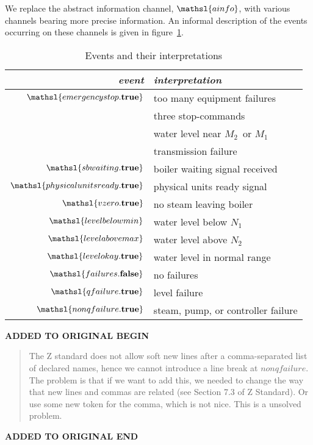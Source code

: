 \documentclass{report}
\newcommand{\true}{\ensuremath{\mathbf{true}}}
\newcommand{\false}{\ensuremath{\mathbf{false}}}
\newcommand{\event}[1]{\mathsl{#1}}
\newenvironment{addedstuff}{\begin{flushleft}\textbf{ADDED TO ORIGINAL BEGIN}\begin{quote}\begin{minipage}{.8\textwidth}}{\end{minipage}\end{quote}\textbf{ADDED TO ORIGINAL END}\end{flushleft}}
\begin{document}
We replace the abstract information channel, \( \mathsl{ainfo} \),
with various channels bearing more precise information.  An informal
description of the events occurring on these channels is given in
figure~\ref{figure:events}.
\begin{table}[htbp]
  \bigskip %
  \begin{center}
    \begin{tabular}{r|l}
      \textbf{\slshape event} & \textbf{\slshape interpretation}
      \\ %
      \hline %
      \( \event{emergencystop.\true} \) & too many equipment failures
      \\ %
      & three stop-commands
      \\ %
      & water level near \( M_2 \, \)\/ or \( M_1 \)
      \\ %
      & transmission failure
      \\ %
      \( \event{sbwaiting.\true} \) & boiler waiting signal received
      \\ %
      \( \event{physicalunitsready.\true} \) & physical units ready signal
      \\ %
      \( \event{vzero.\true} \) & no steam leaving boiler
      \\ %
      \( \event{levelbelowmin} \) & water level below \( N_1 \)
      \\ %
      \( \event{levelabovemax} \) & water level above \( N_2 \)
      \\ %
      \( \event{levelokay.\true} \) & water level in normal range
      \\ %
      \( \event{failures.\false} \) & no failures
      \\ %
      \( \event{qfailure.\true} \) & level failure
      \\ %
      \( \event{nonqfailure.\true} \) & steam, pump, or controller failure
    \end{tabular}
  \end{center}
  \caption{Events and their interpretations}\label{figure:events}
\end{table}
%
\begin{addedstuff}
   The Z standard does not allow soft new lines after a comma-separated list
   of declared names, hence we cannot introduce a line break at $nonqfailure$.
   The problem is that if we want to add this, we needed to change the way that
   new lines and commas are related (see Section 7.3 of Z Standard). Or use some
   new token for the comma, which is not nice. This is a unsolved problem.
\end{addedstuff}
\end{document}
